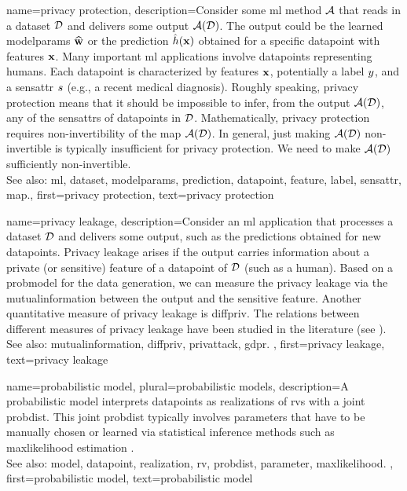 {name={privacy protection},
     description={Consider some \gls{ml} method $\mathcal{A}$ that reads 
	 	in a \gls{dataset} $\mathcal{D}$ and delivers some output $\mathcal{A}(\mathcal{D})$. The output 
	 	could be the learned \gls{modelparams} $\widehat{{\bf w}}$ or the \gls{prediction} 
	 	$\hat{h}({\bf x})$ obtained for a specific \gls{datapoint} with \glspl{feature} 
	 	${\bf x}$. Many important \gls{ml} applications involve \glspl{datapoint} 
		representing humans. Each \gls{datapoint} is characterized by \glspl{feature} ${\bf x}$, 
		potentially a \gls{label} $y$, and a \gls{sensattr} $s$ (e.g., a recent medical diagnosis). 
		Roughly speaking, privacy protection means that it should be impossible to infer, from the output $\mathcal{A}(\mathcal{D})$, 
		any of the \glspl{sensattr} of \glspl{datapoint} in $\mathcal{D}$. Mathematically, privacy protection requires non-invertibility 
		of the \gls{map} $\mathcal{A}(\mathcal{D})$. In general, just making $\mathcal{A}(\mathcal{D})$ non-invertible 
		is typically insufficient for privacy protection. We need to make $\mathcal{A}(\mathcal{D})$ sufficiently non-invertible. 
					\\ 
		See also: \gls{ml}, \gls{dataset}, \gls{modelparams}, \gls{prediction}, \gls{datapoint}, \gls{feature}, \gls{label}, \gls{sensattr}, \gls{map}.}, 
	first={privacy protection}, 
	text={privacy protection} 
}

{name={privacy leakage},
	description={Consider an \gls{ml} application that processes a 
		\gls{dataset} $\mathcal{D}$ and delivers some output, such as the \glspl{prediction} 
		obtained for new \glspl{datapoint}. Privacy leakage arises 
		if the output carries information about a private (or sensitive) \gls{feature} of 
		a \gls{datapoint} of $\mathcal{D}$ (such as a human). Based on a \gls{probmodel} 
		for the \gls{data} generation, we can measure the privacy leakage via the \gls{mutualinformation} 
		between the output and the sensitive \gls{feature}. Another quantitative measure of privacy leakage 
		is \gls{diffpriv}. The relations between different measures of privacy leakage have been 
		studied in the literature (see \cite{InfThDiffPriv}). 
				\\ 
		See also: \gls{mutualinformation}, \gls{diffpriv}, \gls{privattack}, \gls{gdpr}. }, 
	first={privacy leakage}, 
	text={privacy leakage} 
}


{name={probabilistic model}, plural={probabilistic models},
	description={A probabilistic \gls{model} interprets \glspl{datapoint} 
		as \glspl{realization} of \glspl{rv} with a joint \gls{probdist}. This joint \gls{probdist} typically 
		involves \glspl{parameter} that have to be manually chosen or learned via statistical inference 
		methods such as \gls{maxlikelihood} estimation \cite{LC}.
					\\ 
		See also: \gls{model}, \gls{datapoint}, \gls{realization}, \gls{rv}, \gls{probdist}, \gls{parameter}, \gls{maxlikelihood}. }, 
	first={probabilistic model}, 
	text={probabilistic model} 
}


